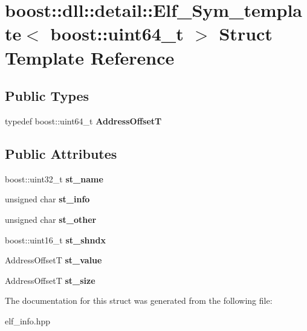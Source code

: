\hypertarget{a00090}{}\section{boost\+:\+:dll\+:\+:detail\+:\+:Elf\+\_\+\+Sym\+\_\+template$<$ boost\+:\+:uint64\+\_\+t $>$ Struct Template Reference}
\label{a00090}
\subsection*{Public Types}
\begin{DoxyCompactItemize}
\item 
typedef boost\+::uint64\+\_\+t {\bfseries Address\+OffsetT}\hypertarget{a00090_ad1e44aba1f99d966aa2709e3bdcd47fe}{}\label{a00090_ad1e44aba1f99d966aa2709e3bdcd47fe}

\end{DoxyCompactItemize}
\subsection*{Public Attributes}
\begin{DoxyCompactItemize}
\item 
boost\+::uint32\+\_\+t {\bfseries st\+\_\+name}\hypertarget{a00090_a622647e816f59015eafe01228113a646}{}\label{a00090_a622647e816f59015eafe01228113a646}

\item 
unsigned char {\bfseries st\+\_\+info}\hypertarget{a00090_ae28b231a04d45e9e22039be6bc174b60}{}\label{a00090_ae28b231a04d45e9e22039be6bc174b60}

\item 
unsigned char {\bfseries st\+\_\+other}\hypertarget{a00090_aff5bd6040881e1411f92650ce08fff84}{}\label{a00090_aff5bd6040881e1411f92650ce08fff84}

\item 
boost\+::uint16\+\_\+t {\bfseries st\+\_\+shndx}\hypertarget{a00090_ac6f0b6c91c7c5e9ce4c4ef6e8adbf284}{}\label{a00090_ac6f0b6c91c7c5e9ce4c4ef6e8adbf284}

\item 
Address\+OffsetT {\bfseries st\+\_\+value}\hypertarget{a00090_aa4e2698ae197ce1df4a7ea931e075cd6}{}\label{a00090_aa4e2698ae197ce1df4a7ea931e075cd6}

\item 
Address\+OffsetT {\bfseries st\+\_\+size}\hypertarget{a00090_a6c32a90249fb0b6c430075634bfc5db1}{}\label{a00090_a6c32a90249fb0b6c430075634bfc5db1}

\end{DoxyCompactItemize}


The documentation for this struct was generated from the following file\+:\begin{DoxyCompactItemize}
\item 
elf\+\_\+info.\+hpp\end{DoxyCompactItemize}
